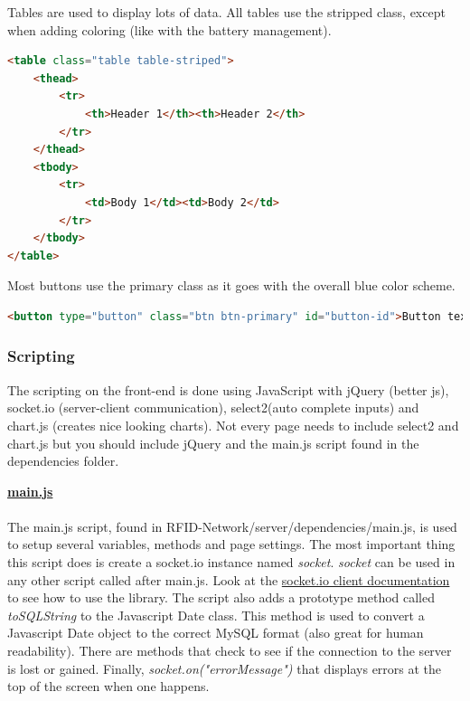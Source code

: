 \documentclass[12pt]{article}
\begin{document}
Tables are used to display lots of data.  All tables use the stripped class, except when adding coloring (like with the battery management).
\begin{lstlisting}[language=html, caption="Bootstrap table", breaklines=true]
<table class="table table-striped">
	<thead>
		<tr>
			<th>Header 1</th><th>Header 2</th>
		</tr>
	</thead>
	<tbody>
		<tr>
			<td>Body 1</td><td>Body 2</td>
		</tr>
	</tbody>
</table>
\end{lstlisting}

Most buttons use the primary class as it goes with the overall blue color scheme.
\begin{lstlisting}[language=html, caption="Bootstrap button", breaklines=true]
<button type="button" class="btn btn-primary" id="button-id">Button text</button>
\end{lstlisting}

\subsubsection{Scripting}
The scripting on the front-end is done using JavaScript with jQuery (better js), socket.io (server-client communication), select2(auto complete inputs) and chart.js (creates nice looking charts).  Not every page needs to include select2 and chart.js but you should include jQuery and the main.js script found in the dependencies folder.  


\underline{\textbf{main.js}}\\\\
The main.js script, found in RFID-Network/server/dependencies/main.js, is used to setup several variables, methods and page settings.  The most important thing this script does is create a socket.io instance named \textit{socket}.  \textit{socket} can be used in any other script called after main.js.  Look at the \href{https://socket.io/docs/client-api/}{socket.io client documentation} to see how to use the library.  The script also adds a prototype method called \textit{toSQLString} to the Javascript Date class.  This method is used to convert a Javascript Date object to the correct MySQL format (also great for human readability).  There are methods that check to see if the connection to the server is lost or gained.  Finally, \textit{socket.on("errorMessage")} that displays errors at the top of the screen when one happens.
\end{document}
